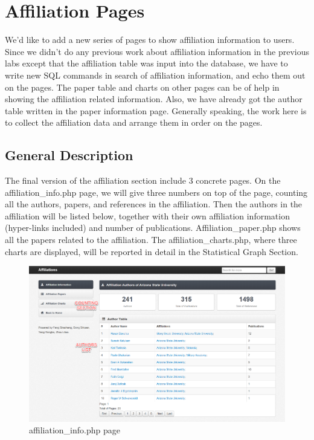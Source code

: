 \documentclass{book}
\begin{document}
\section {Affiliation Pages}

We'd like to add a new series of pages to show affiliation information to users. Since we didn't do any previous work about affiliation information in the previous labs except that the affiliation table was input into the database, we have to write new SQL commands in search of affiliation information, and echo them out on the pages. The paper table and charts on other pages can be of help in showing the affiliation related information. Also, we have already got the author table written in the paper information page. Generally speaking, the work here is to collect the affiliation data and arrange them in order on the pages.


\subsection {General Description}

The final version of the affiliation section include 3 concrete pages. On the affiliation\_info.php page, we will give three numbers on top of the page, counting all the authors, papers, and references in the affiliation. Then the authors in the affiliation will be listed below, together with their own affiliation information (hyper-links included) and number of publications. Affiliation\_paper.php shows all the papers related to the affiliation. The affiliation\_charts.php, where three charts are displayed, will be reported in detail in the Statistical Graph Section.

\begin{figure}[H]
\centering
\includegraphics[scale=0.35]{img/zlt_aff_demo1.png}
\caption{affiliation\_info.php page}
\end{figure}
\end{document}
